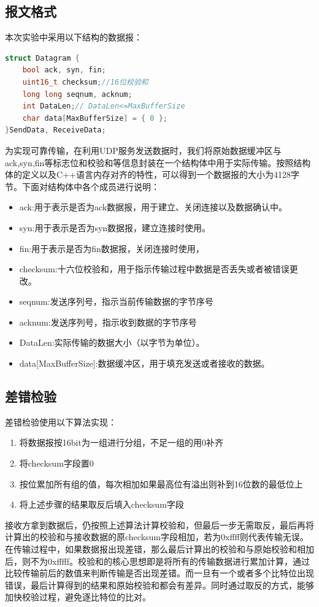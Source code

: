 \documentclass[UTF8,a4paper,10pt]{ctexart}
\begin{document}
\subsection{报文格式}
本次实验中采用以下结构的数据报：
\begin{lstlisting}[frame=trbl,language={C++}]
struct Datagram {
    bool ack, syn, fin;
    uint16_t checksum;//16位校验和
    long long seqnum, acknum;
    int DataLen;// DataLen<=MaxBufferSize
    char data[MaxBufferSize] = { 0 };
}SendData, ReceiveData;
\end{lstlisting}
为实现可靠传输，在利用UDP服务发送数据时，我们将原始数据缓冲区与ack,syn,fin等标志位和校验和等信息封装在一个结构体中用于实际传输。按照结构体的定义以及C++语言内存对齐的特性，可以得到一个数据报的大小为4128字节。下面对结构体中各个成员进行说明：\par
\begin{itemize}
\item ack:用于表示是否为ack数据报，用于建立、关闭连接以及数据确认中。
\item syn:用于表示是否为syn数据报，建立连接时使用。
\item fin:用于表示是否为fin数据报，关闭连接时使用，
\item checksum:十六位校验和，用于指示传输过程中数据是否丢失或者被错误更改。
\item seqnum:发送序列号，指示当前传输数据的字节序号
\item acknum:发送序列号，指示收到数据的字节序号
\item DataLen:实际传输的数据大小（以字节为单位）。
\item data[MaxBufferSize]:数据缓冲区，用于填充发送或者接收的数据。
\end{itemize}

\subsection{差错检验}
差错检验使用以下算法实现：
\begin{enumerate}
    \item 将数据报按16bit为一组进行分组，不足一组的用0补齐
    \item 将checksum字段置0
    \item 按位累加所有组的值，每次相加如果最高位有溢出则补到16位数的最低位上
    \item 将上述步骤的结果取反后填入checksum字段
\end{enumerate}\par
接收方拿到数据后，仍按照上述算法计算校验和，但最后一步无需取反，最后再将计算出的校验和与接收数据的原checksum字段相加，若为0xffff则代表传输无误。在传输过程中，如果数据报出现差错，那么最后计算出的校验和与原始校验和相加后，则不为0xfffff。校验和的核心思想即是将所有的传输数据进行累加计算，通过比较传输前后的数值来判断传输是否出现差错。而一旦有一个或者多个比特位出现错误，最后计算得到的结果和原始校验和都会有差异。同时通过取反的方式，能够加快校验过程，避免逐比特位的比对。
\end{document}
